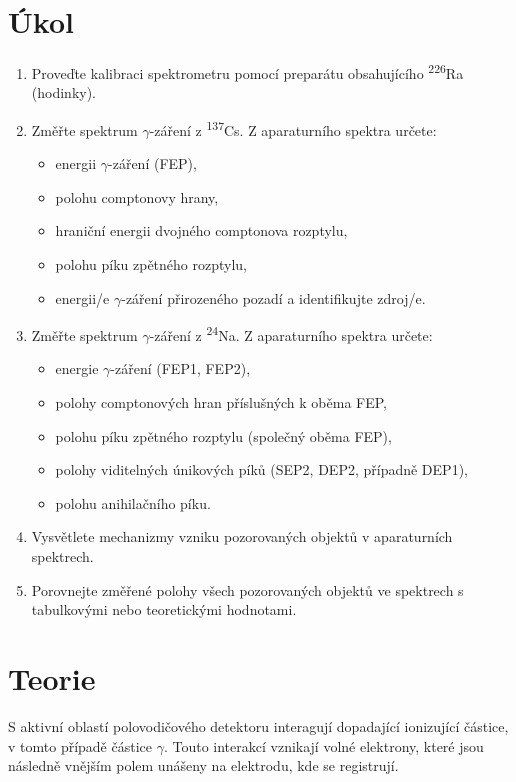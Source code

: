 \documentclass{protokol}
\begin{document}
  \section*{Úkol}

    \begin{enumerate}
      \item Proveďte kalibraci spektrometru pomocí preparátu obsahujícího \textsuperscript{226}Ra (hodinky).
      \item Změřte spektrum $\gamma$-záření z \textsuperscript{137}Cs. Z aparaturního spektra určete:
      \begin{itemize}
        \item energii $\gamma$-záření (FEP),
        \item polohu comptonovy hrany,
        \item hraniční energii dvojného comptonova rozptylu,
        \item polohu píku zpětného rozptylu,
        \item energii/e $\gamma$-záření přirozeného pozadí a identifikujte zdroj/e.
      \end{itemize}
      \item Změřte spektrum $\gamma$-záření z \textsuperscript{24}Na. Z aparaturního spektra určete:
      \begin{itemize}
        \item energie $\gamma$-záření (FEP1, FEP2),
        \item polohy comptonových hran příslušných k oběma FEP,
        \item polohu píku zpětného rozptylu (společný oběma FEP),
        \item polohy viditelných únikových píků (SEP2, DEP2, případně DEP1),
        \item polohu anihilačního píku.
      \end{itemize}
      \item Vysvětlete mechanizmy vzniku pozorovaných objektů v aparaturních spektrech.
      \item Porovnejte změřené polohy všech pozorovaných objektů ve spektrech s tabulkovými
      nebo teoretickými hodnotami. 
      
    \end{enumerate}

  \section*{Teorie}

    S aktivní oblastí polovodičového detektoru interagují dopadající ionizující částice, v tomto případě částice $\gamma$. Touto interakcí vznikají volné elektrony, které jsou následně vnějším polem unášeny na elektrodu, kde se registrují.
    
\end{document}
